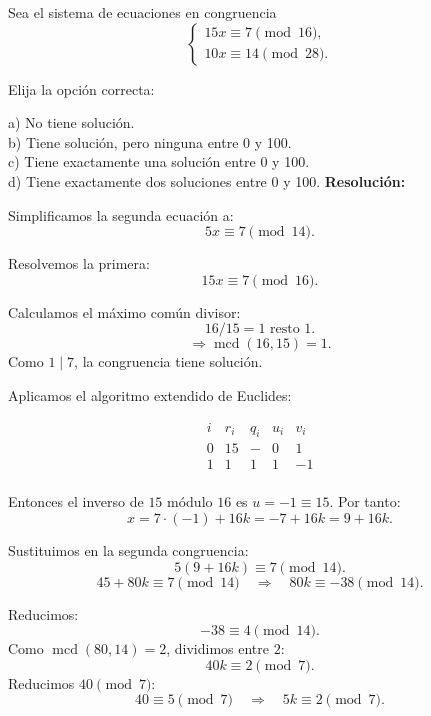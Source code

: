 \documentclass[a4paper,12pt]{article}
\begin{document}
\begin{ejercicio}[title=Ejercicio 39]
Sea el sistema de ecuaciones en congruencia
\[
\begin{cases}
15x \equiv 7 \pmod{16},\\
10x \equiv 14 \pmod{28}.
\end{cases}
\]

Elija la opción correcta:

a) No tiene solución.  \\
b) Tiene solución, pero ninguna entre 0 y 100.  \\
c) Tiene exactamente una solución entre 0 y 100.  \\
d) Tiene exactamente dos soluciones entre 0 y 100.
\tcblower
\textbf{Resolución:}

Simplificamos la segunda ecuación a:
\[
5x \equiv 7 \pmod{14}.
\]

Resolvemos la primera:
\[
15x \equiv 7 \pmod{16}.
\]

Calculamos el máximo común divisor:
\[
16 / 15 = 1 \text{ resto } \boxed{1}.
\]
\[
\Rightarrow \operatorname{mcd}(16,15) = \boxed{1}.
\]
Como $1\mid 7$, la congruencia tiene solución.

Aplicamos el algoritmo extendido de Euclides:

\[
\begin{array}{c|c|c|c|c}
i & r_i & q_i & u_i & v_i \\ \hline
0 & 15 & - & 0 & 1 \\
1 & \boxed{1} & 1 & 1 & -1 \\
\end{array}
\]

Entonces el inverso de $15$ módulo $16$ es $u = -1 \equiv 15$.  
Por tanto:
\[
x = 7\cdot(-1) + 16k = -7 + 16k = 9 + 16k.
\]

Sustituimos en la segunda congruencia:
\[
5(9 + 16k) \equiv 7 \pmod{14}.
\]
\[
45 + 80k \equiv 7 \pmod{14} \quad\Rightarrow\quad 80k \equiv -38 \pmod{14}.
\]

Reducimos:
\[
-38 \equiv 4 \pmod{14}.
\]
Como $\operatorname{mcd}(80,14)=2$, dividimos entre $2$:
\[
40k \equiv 2 \pmod{7}.
\]
Reducimos $40 \pmod{7}$:
\[
40 \equiv 5 \pmod{7} \quad\Rightarrow\quad 5k \equiv 2 \pmod{7}.
\]

\end{ejercicio}
\end{document}
